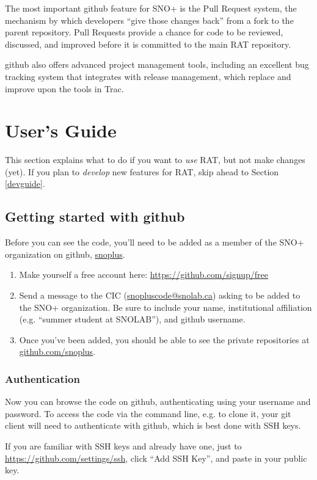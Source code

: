 \documentclass{article}
\begin{document}
The most important github feature for SNO+ is the Pull Request system, the mechanism by which developers ``give those changes back'' from a fork to the parent repository. Pull Requests provide a chance for code to be reviewed, discussed, and improved before it is committed to the main RAT repository.

github also offers advanced project management tools, including an excellent bug tracking system that integrates with release management, which replace and improve upon the tools in Trac.
\section{User's Guide}
This section explains what to do if you want to {\it use} RAT, but not make changes (yet). If you plan to {\it develop} new features for RAT, skip ahead to Section \ref{devguide}.
\subsection{Getting started with github}
\label{get-started}
Before you can see the code, you'll need to be added as a member of the SNO+ organization on github, \href{http://github.com/snoplus}{snoplus}.
\begin{enumerate}
\item Make yourself a free account here: \href{https://github.com/signup/free}{https://github.com/signup/free}
\item Send a message to the CIC (\href{mailto:snopluscode@snolab.ca}{snopluscode@snolab.ca}) asking to be added to the SNO+ organization. Be sure to include your name, institutional affiliation (e.g. ``summer student at SNOLAB''), and github username.
\item Once you've been added, you should be able to see the private repositories at \href{http://github.com/snoplus}{github.com/snoplus}.
\end{enumerate}

\subsubsection{Authentication}
Now you can browse the code on github, authenticating using your username and password. To access the code via the command line, e.g. to clone it, your git client will need to authenticate with github, which is best done with SSH keys.

If you are familiar with SSH keys and already have one, just to \href{https://github.com/settings/ssh}{https://github.com/settings/ssh}, click ``Add SSH Key'', and paste in your public key.
\end{document}

